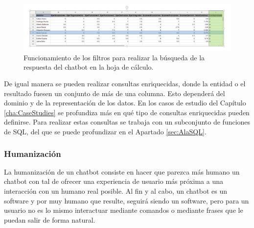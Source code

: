 \begin{figure}[htb]
	\centering
	\includegraphics[width=1.1\textwidth]{./figs/SheetFilter.png}
	\caption{Funcionamiento de los filtros para realizar la búsqueda de la respuesta del chatbot en la hoja de cálculo.}
	\label{fig:SheetFilter}
\end{figure}

De igual manera se pueden realizar consultas enriquecidas, donde la entidad o el resultado fuesen un conjunto de más de una columna. Esto dependerá del dominio y de la representación de los datos. En los casos de estudio del Capítulo \ref{cha:CaseStudies} se profundiza más en qué tipo de consultas enriquecidas pueden definirse. Para realizar estas consultas se trabaja con un subconjunto de funciones de SQL, del que se puede profundizar en el Apartado \ref{sec:AlaSQL}. 

\subsubsection{Humanización}
\label{sec:Humanization}

La humanización de un chatbot consiste en hacer que parezca más humano un chatbot con tal de ofrecer una experiencia de usuario más próxima a una interacción con un humano real posible. Al fin y al cabo, un chatbot es un software y por muy humano que resulte, seguirá siendo un software, pero para un usuario no es lo mismo interactuar mediante comandos o mediante frases que le puedan salir de forma natural.

